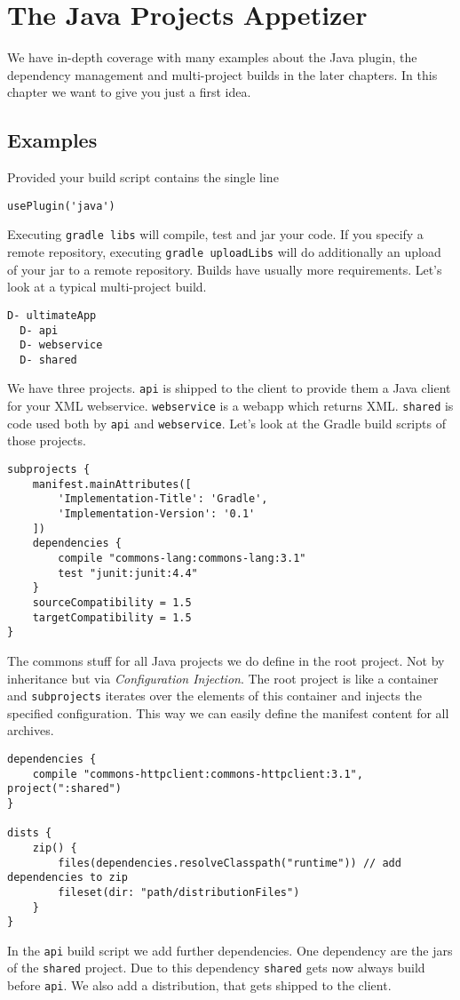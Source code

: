 \chapter{The Java Projects Appetizer} %
\label{cha:the_java_projects_tutorial}
We have in-depth coverage with many examples about the Java plugin, the dependency management and multi-project builds in the later chapters. In this chapter we want to give you just a first idea.

\section{Examples} %
\label{sec:examples}
Provided your build script contains the single line
\begin{Verbatim}
usePlugin('java')
\end{Verbatim}
Executing \texttt{gradle libs} will compile, test and jar your code. If you specify a remote repository, executing \texttt{gradle uploadLibs} will do additionally an upload of your jar to a remote repository. 
Builds have usually more requirements. Let's look at a typical multi-project build.

\begin{Verbatim}[frame=single,label=Project Tree]
D- ultimateApp
  D- api
  D- webservice
  D- shared 
\end{Verbatim}
We have three projects. \texttt{api} is shipped to the client to provide them a Java client for your XML webservice. \texttt{webservice} is a webapp which returns XML. \texttt{shared} is code used both by \texttt{api} and \texttt{webservice}. Let's look at the Gradle build scripts of those projects.

\begin{Verbatim}[frame=single,label=ultimateApp]
subprojects {
    manifest.mainAttributes([	       
	    'Implementation-Title': 'Gradle',
		'Implementation-Version': '0.1'
	])
	dependencies {
		compile "commons-lang:commons-lang:3.1"
		test "junit:junit:4.4"
	}
	sourceCompatibility = 1.5
	targetCompatibility = 1.5
}
\end{Verbatim}
The commons stuff for all Java projects we do define in the root project. Not by inheritance but via \emph{Configuration Injection}. The root project is like a container and \texttt{subprojects} iterates over the elements of this container and injects the specified configuration. This way we can easily define the manifest content for all archives.

\begin{Verbatim}[frame=single,label=api]
dependencies {
	compile "commons-httpclient:commons-httpclient:3.1", project(":shared")
}

dists {
	zip() {
		files(dependencies.resolveClasspath("runtime")) // add dependencies to zip
		fileset(dir: "path/distributionFiles")
	}
}
\end{Verbatim}
In the \texttt{api} build script we add further dependencies. One dependency are the jars of the \texttt{shared} project. Due to this dependency \texttt{shared} gets now always build before \texttt{api}. We also add a distribution, that gets shipped to the client.



